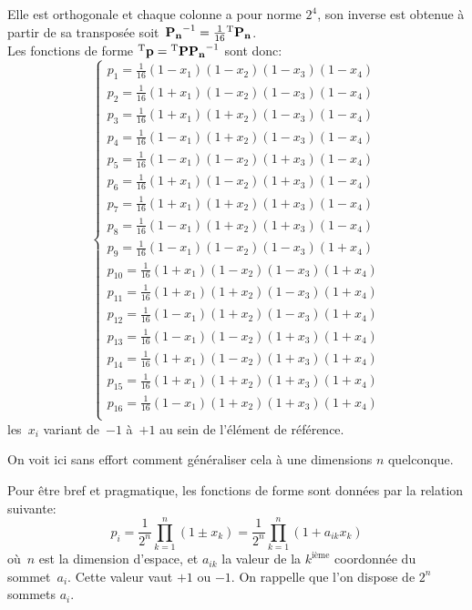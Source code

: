 Elle est orthogonale et chaque colonne a pour norme $2^4$, son inverse est obtenue à partir de sa transposée soit~$\MMI{P_n}=\frac1{16}\MMT{P_n}$.\\
Les fonctions de forme $\LL{p}=\LL{P}\MMI{P_n}$ sont donc:
\begin{equation}
\left\{
\begin{array}{lr}
p_1 = \frac{1}{16}(1-x_1)(1-x_2)(1-x_3)(1-x_4)\\
p_2 = \frac{1}{16}(1+x_1)(1-x_2)(1-x_3)(1-x_4)\\
p_3 = \frac{1}{16}(1+x_1)(1+x_2)(1-x_3)(1-x_4)\\
p_4 = \frac{1}{16}(1-x_1)(1+x_2)(1-x_3)(1-x_4)\\
p_5 = \frac{1}{16}(1-x_1)(1-x_2)(1+x_3)(1-x_4)\\
p_6 = \frac{1}{16}(1+x_1)(1-x_2)(1+x_3)(1-x_4)\\
p_7 = \frac{1}{16}(1+x_1)(1+x_2)(1+x_3)(1-x_4)\\
p_8 = \frac{1}{16}(1-x_1)(1+x_2)(1+x_3)(1-x_4)\\
p_9 = \frac{1}{16}(1-x_1)(1-x_2)(1-x_3)(1+x_4)\\
p_{10} = \frac{1}{16}(1+x_1)(1-x_2)(1-x_3)(1+x_4)\\
p_{11} = \frac{1}{16}(1+x_1)(1+x_2)(1-x_3)(1+x_4)\\
p_{12} = \frac{1}{16}(1-x_1)(1+x_2)(1-x_3)(1+x_4)\\
p_{13} = \frac{1}{16}(1-x_1)(1-x_2)(1+x_3)(1+x_4)\\
p_{14} = \frac{1}{16}(1+x_1)(1-x_2)(1+x_3)(1+x_4)\\
p_{15} = \frac{1}{16}(1+x_1)(1+x_2)(1+x_3)(1+x_4)\\
p_{16} = \frac{1}{16}(1-x_1)(1+x_2)(1+x_3)(1+x_4)\\
\end{array}
\right.
\end{equation}
les~$x_i$ variant de~$-1$ à~$+1$ au sein de l'élément de référence.

\begin{remarque}[Généralisation]
On voit ici sans effort comment généraliser cela à une dimensions $n$ quelconque.

Pour être bref et pragmatique, les fonctions de forme sont données par la relation suivante:
\begin{equation}
p_i = \frac1{2^n}\prod_{k=1}^{n}(1\pm x_k) = \frac1{2^n}\prod_{k=1}^{n}(1+a_{ik} x_k)
\end{equation}
où~$n$ est la dimension d'espace, et $a_{ik}$ la valeur de la $k^{\text{ième}}$ coordonnée du sommet~$a_i$. Cette valeur vaut $+1$ ou $-1$. On rappelle que l'on dispose de $2^n$ sommets $a_i$.
\end{remarque}

